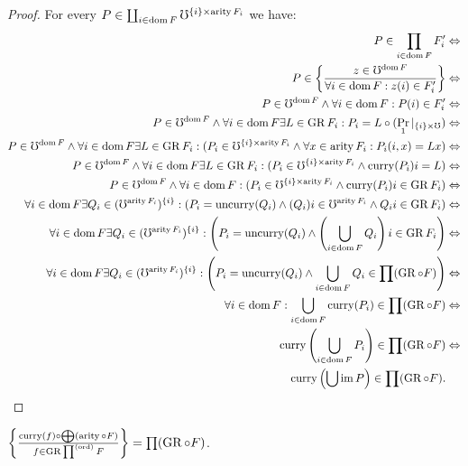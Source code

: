 \begin{proof}
For every $P\in\coprod_{i\in\operatorname{dom} F}\mho^{\{i\}\times\operatorname{arity} F_{i}}$
we have:
\begin{align*}
P\in\prod_{i\in\operatorname{dom} F}F'_{i} & \Leftrightarrow\\
P\in\left\{ \frac{z\in\mho^{\operatorname{dom} F}}{\forall i\in\operatorname{dom} F:z(i)\in F'_{i}}\right\} & \Leftrightarrow\\
P\in\mho^{\operatorname{dom} F}\land\forall i\in\operatorname{dom} F:P(i)\in F'_{i} & \Leftrightarrow\\
P\in\mho^{\operatorname{dom} F}\land\forall i\in\operatorname{dom} F\exists L\in\operatorname{GR} F_{i}:P_{i}=L\circ(\Pr_{1}|_{\{i\}\times\mho}) & \Leftrightarrow\\
P\in\mho^{\operatorname{dom} F}\land\forall i\in\operatorname{dom} F\exists L\in\operatorname{GR} F_{i}:(P_{i}\in\mho^{\{i\}\times\operatorname{arity} F_{i}}\land\forall x\in\operatorname{arity} F_{i}:P_{i}(i,x)=Lx) & \Leftrightarrow\\
P\in\mho^{\operatorname{dom} F}\land\forall i\in\operatorname{dom} F\exists L\in\operatorname{GR} F_{i}:(P_{i}\in\mho^{\{i\}\times\operatorname{arity} F_{i}}\land\operatorname{curry}(P_{i})i=L) & \Leftrightarrow\\
P\in\mho^{\operatorname{dom} F}\land\forall i\in\operatorname{dom} F:(P_{i}\in\mho^{\{i\}\times\operatorname{arity} F_{i}}\land\operatorname{curry}(P_{i})i\in\operatorname{GR} F_{i}) & \Leftrightarrow\\
\forall i\in\operatorname{dom} F\exists Q_{i}\in(\mho^{\operatorname{arity} F_{i}})^{\{i\}}:(P_{i}=\operatorname{uncurry}(Q_{i})\land(Q_{i})i\in\mho^{\operatorname{arity} F_{i}}\land Q_{i}i\in\operatorname{GR} F_{i}) & \Leftrightarrow\\
\forall i\in\operatorname{dom} F\exists Q_{i}\in(\mho^{\operatorname{arity} F_{i}})^{\{i\}}:\left(P_{i}=\operatorname{uncurry}(Q_{i})\land\left(\bigcup_{i\in\operatorname{dom} F}Q_{i}\right)i\in\operatorname{GR} F_{i}\right) & \Leftrightarrow\\
\forall i\in\operatorname{dom} F\exists Q_{i}\in(\mho^{\operatorname{arity} F_{i}})^{\{i\}}:\left(P_{i}=\operatorname{uncurry}(Q_{i})\land\bigcup_{i\in\operatorname{dom} F}Q_{i}\in\prod(\operatorname{GR}\circ F)\right) & \Leftrightarrow\\
\forall i\in\operatorname{dom} F:\bigcup_{i\in\operatorname{dom} F}\operatorname{curry}(P_{i})\in\prod(\operatorname{GR}\circ F) & \Leftrightarrow\\
\operatorname{curry}\left(\bigcup_{i\in\operatorname{dom} F}P_{i}\right)\in\prod(\operatorname{GR}\circ F) & \Leftrightarrow\\
\operatorname{curry}\left(\bigcup\operatorname{im} P\right)\in\prod(\operatorname{GR}\circ F).
\end{align*}
\end{proof}
\begin{lem}
$\left\{ \frac{\operatorname{curry}(f)\circ\bigoplus(\operatorname{arity}\circ F)}{f\in\operatorname{GR}\prod^{\mathrm{(ord)}}F}\right\}=\prod(\operatorname{GR}\circ F)$.\end{lem}
